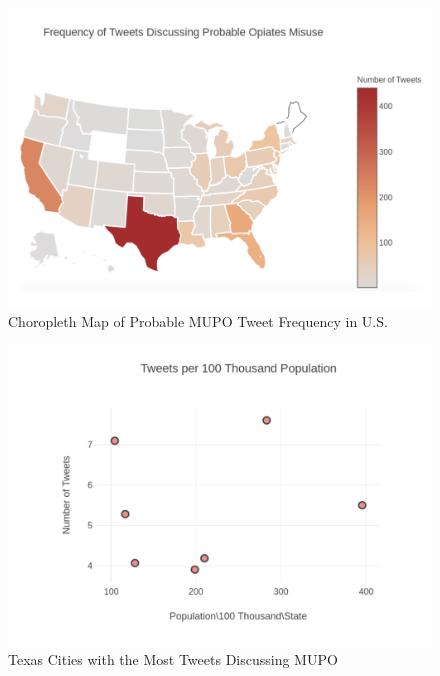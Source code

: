 \documentclass[sigconf]{acmart}
\begin{document}
\begin{figure}[!ht]
  \centering\includegraphics[width=\columnwidth]{images/Figure4.pdf}
  \caption{Choropleth Map of Probable MUPO Tweet Frequency in U.S.}
  \label{f:Figure4}
\end{figure}

\begin{figure}[!ht]
  \centering\includegraphics[width=\columnwidth]{images/Figure5.pdf}
  \caption{Texas Cities with the Most Tweets Discussing MUPO}
  \label{f:Figure5}
\end{figure}
\end{document}
